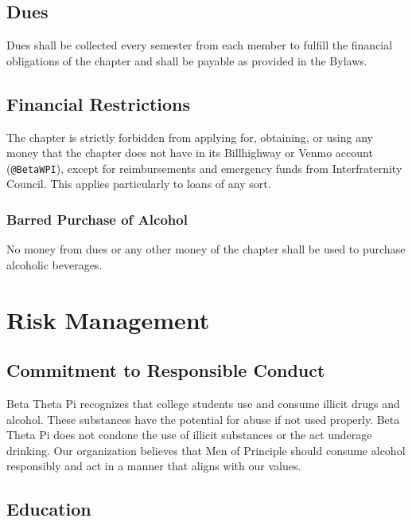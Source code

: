 \section{Dues}
\label{sec:dues}

Dues shall be collected every semester from each member to fulfill the financial
obligations of the chapter and shall be payable as provided in the Bylaws.

\section{Financial Restrictions}
\label{sec:financial-restrictions}

The chapter is strictly forbidden from applying for, obtaining, or using any
money that the chapter does not have in its Billhighway or Venmo account
(\texttt{@BetaWPI}), except for reimbursements and emergency funds from
Interfraternity Council.
This applies particularly to loans of any sort.

\subsection{Barred Purchase of Alcohol}
\label{sec:barred-purchase-of-alcohol}

No money from dues or any other money of the chapter shall be used to purchase
alcoholic beverages.

\chapter{Risk Management}
\label{cha:risk-management}

\section{Commitment to Responsible Conduct}
\label{sec:commitment-to-responsible-conduct}

Beta Theta Pi recognizes that college students use and consume illicit drugs and
alcohol.
These substances have the potential for abuse if not used properly.
Beta Theta Pi does not condone the use of illicit substances or the act underage
drinking.
Our organization believes that Men of Principle should consume alcohol
responsibly and act in a manner that aligns with our values.

\section{Education}
\label{sec:education}

